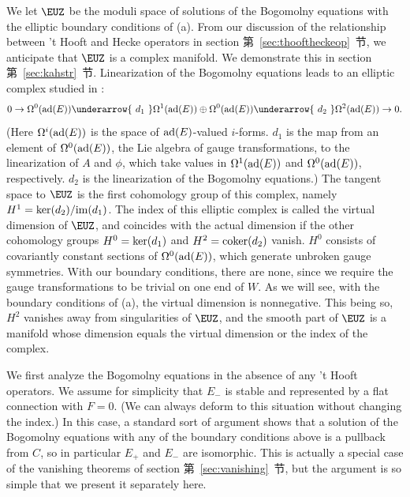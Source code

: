 \par{}

We let ${\EUZ}$ be the moduli space of solutions of the Bogomolny
equations with the elliptic boundary conditions of \utampo(a).
{}From our discussion of the relationship between 't Hooft and
Hecke operators in section 第~\ref{sec:thooftheckeop}~节, we anticipate that
${\EUZ}$ is a complex manifold. We demonstrate this in section
第~\ref{sec:kahstr}~节. Linearization of the Bogomolny equations leads to an
elliptic complex studied in \cite{ref107,ref108}:
\setcounter{equation}{0}
\begin{equation}\label{eq:tifor}
0\to \Omega^0({\rm
ad}(E))\underarrow{~d_1~}\Omega^1({\rm ad}(E))\oplus \Omega^0({\rm
ad}(E))\underarrow{~d_2~}\Omega^2({\rm ad}(E))\to 0 .
\end{equation}
 (Here
$\Omega^i({\rm ad}(E))$ is the space of ${\rm ad}(E)$-valued
$i$-forms.  $d_1$ is the map from an element of $\Omega^0({\rm
ad}(E))$, the Lie algebra of gauge transformations, to the
linearization of $A$ and $\phi$, which take values in
$\Omega^1({\rm ad}(E))$ and $\Omega^0({\rm ad}(E))$, respectively.
$d_2$ is the linearization of the Bogomolny equations.) The
tangent space to ${\EUZ}$ is the first cohomology group of this
complex, namely $ H^1={\rm ker}(d_2)/{\rm im}(d_1)$. The index of
this elliptic complex is called the virtual dimension of ${\EUZ}$,
and coincides with the actual dimension if the other cohomology
groups $H^0={\rm ker}(d_1)$ and $H^2={\rm coker}(d_2)$ vanish.
$H^0$ consists of covariantly constant sections of $\Omega^0({\rm
ad}(E))$, which generate unbroken gauge symmetries. With our
boundary conditions, there are none, since we require the gauge
transformations to be trivial on one end of $W$. As we will see,
with the boundary conditions of \utampo(a), the virtual dimension
is nonnegative.  This being so, $H^2$ vanishes away from
singularities of ${\EUZ}$, and the smooth part of ${\EUZ}$ is a
manifold whose dimension equals the virtual dimension or the index
of the complex.

We first analyze the Bogomolny equations in the absence of any 't
Hooft operators. We assume for simplicity that $E_-$ is stable and
represented by a flat connection with $F=0$.  (We can always
deform to this situation without changing the index.) In this
case, a standard sort of argument shows that a solution of the
Bogomolny equations with any of the boundary conditions above is a
pullback from $C$, so in particular $E_+$ and $E_-$ are
isomorphic.  This is actually a special case of the vanishing
theorems of section 第~\ref{sec:vanishing}~节, but the argument is so simple that
we present it separately here.

